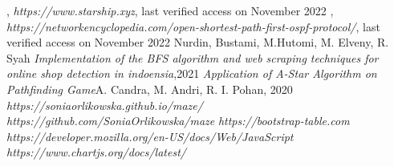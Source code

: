 \begin{thebibliography}{100}
, \emph{https://www.starship.xyz}, last verified access on November 2022
, \emph{https://networkencyclopedia.com/open-shortest-path-first-ospf-protocol/}, last verified access on November 2022
Nurdin, Bustami, M.Hutomi, M. Elveny, R. Syah \emph{Implementation of the BFS algorithm and web scraping techniques for online shop detection in indoensia},2021
 \emph{Application of A-Star Algorithm on Pathfinding Game}A. Candra, M. Andri, R. I. Pohan, 2020
\emph{https://soniaorlikowska.github.io/maze/}
\emph{https://github.com/SoniaOrlikowska/maze}
\emph{https://bootstrap-table.com}
\emph{https://developer.mozilla.org/en-US/docs/Web/JavaScript}
\emph{https://www.chartjs.org/docs/latest/}









\end{thebibliography}
